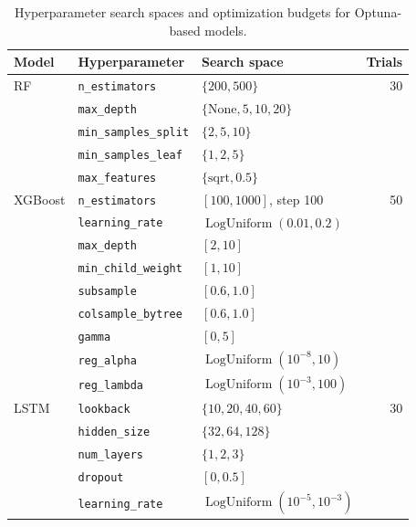\documentclass[12pt,twoside]{ord}
\begin{document}
\begin{table}[htbp]
\centering
\caption{Hyperparameter search spaces and optimization budgets for Optuna-based models.}\label{tab:optuna_search_spaces}
\setlength{\tabcolsep}{4.5pt}
\begin{tabular}{lllr}
\hline
Model & Hyperparameter & Search space & Trials \\
\hline
RF & \texttt{n\_estimators}      & $\{200, 500\}$                    & 30 \\
   & \texttt{max\_depth}         & $\{\text{None}, 5, 10, 20\}$      & \\
   & \texttt{min\_samples\_split}& $\{2, 5, 10\}$                    & \\
   & \texttt{min\_samples\_leaf} & $\{1, 2, 5\}$                     & \\
   & \texttt{max\_features}      & $\{\text{sqrt}, 0.5\}$            & \\
\hline
XGBoost & \texttt{n\_estimators}     & $[100, 1000]$, step 100           & 50 \\
        & \texttt{learning\_rate}    & $\operatorname{LogUniform}(0.01, 0.2)$ & \\
        & \texttt{max\_depth}        & $[2, 10]$                         & \\
        & \texttt{min\_child\_weight}& $[1, 10]$                         & \\
        & \texttt{subsample}         & $[0.6, 1.0]$                      & \\
        & \texttt{colsample\_bytree} & $[0.6, 1.0]$                      & \\
        & \texttt{gamma}             & $[0, 5]$                          & \\
        & \texttt{reg\_alpha}        & $\operatorname{LogUniform}(10^{-8}, 10)$ & \\
        & \texttt{reg\_lambda}       & $\operatorname{LogUniform}(10^{-3}, 100)$ & \\
\hline
LSTM & \texttt{lookback}      & $\{10, 20, 40, 60\}$                        & 30 \\
     & \texttt{hidden\_size}   & $\{32, 64, 128\}$                           & \\
     & \texttt{num\_layers}    & $\{1, 2, 3\}$                               & \\
     & \texttt{dropout}       & $[0, 0.5]$                                  & \\
     & \texttt{learning\_rate} & $\operatorname{LogUniform}(10^{-5}, 10^{-3})$ & \\

\end{tabular}
\end{table}
\end{document}
